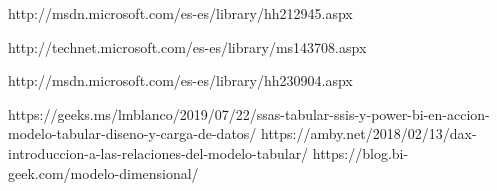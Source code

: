 \documentclass[twoside,twocolumn]{article}
\begin{document}
\begin{thebibliography}{99} 

\bibitem[1]{}
\newblock http://msdn.microsoft.com/es-es/library/hh212945.aspx

\bibitem[2]{}
\newblock http://technet.microsoft.com/es-es/library/ms143708.aspx

\bibitem[3]{}
\newblock http://msdn.microsoft.com/es-es/library/hh230904.aspx

\bibitem[4]{}
\newblock https://geeks.ms/lmblanco/2019/07/22/ssas-tabular-ssis-y-power-bi-en-accion-modelo-tabular-diseno-y-carga-de-datos/
\bibitem[5]{}
\newblock https://amby.net/2018/02/13/dax-introduccion-a-las-relaciones-del-modelo-tabular/
\bibitem[6]{}
\newblock https://blog.bi-geek.com/modelo-dimensional/ 




\end{thebibliography}


\end{document}
